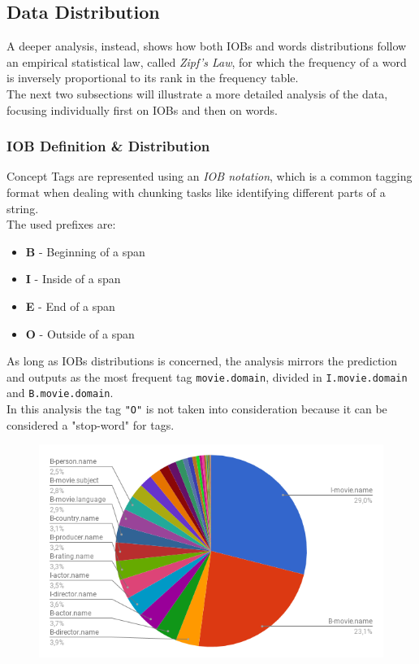 \documentclass[11pt,a4paper]{article}
\begin{document}
\subsection{Data Distribution}

A deeper analysis, instead, shows how both IOBs and words distributions follow an empirical statistical law, called \textit{Zipf's Law}, for which the frequency of a word is inversely proportional to its rank in the frequency table.\\

The next two subsections will illustrate a more detailed analysis of the data, focusing individually first on IOBs and then on words.

\subsubsection{IOB Definition \& Distribution}
 
 Concept Tags are represented using an \textit{IOB notation}, which is a common tagging format when dealing with chunking tasks like identifying different parts of a string. \\
 The used prefixes are:
 \begin{itemize}
 	\item \textbf{B} - Beginning of a span
 	\item \textbf{I} - Inside of a span
 	\item \textbf{E} - End of a span
 	\item \textbf{O} - Outside of a span
 \end{itemize}
 
As long as IOBs distributions is concerned, the analysis mirrors the prediction and outputs as the most frequent tag {\tt movie.domain}, divided in {\tt I.movie.domain} and {\tt B.movie.domain}.\\

In this analysis the tag {\tt "O"} is not taken into consideration because it can be considered a "stop-word" for tags.
 
\begin{figure}[H]
	\includegraphics[scale=.35]{img/IOB_chart_noO.png}
	\label{fig:f1res}
\end{figure}
\end{document}
